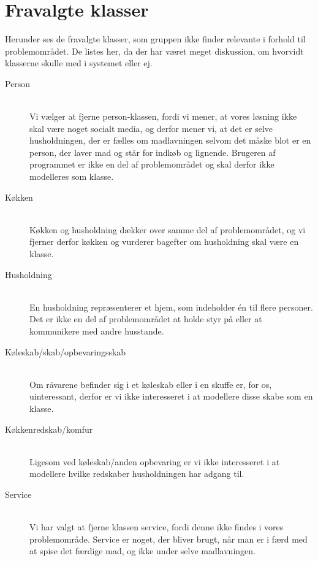 \chapter{Fravalgte klasser}
\label{ap:fravalgteklasser}

Herunder ses de fravalgte klasser, som gruppen ikke finder relevante i forhold til problemområdet. De listes her, da der har været meget diskussion, om hvorvidt klasserne skulle med i systemet eller ej. 

\begin{description}
\item[Person] \hfill \\
Vi vælger at fjerne person-klassen, fordi vi mener, at vores løsning ikke skal være noget socialt media, og derfor mener vi, at det er selve husholdningen, der er fælles om madlavningen selvom det måske blot er en person, der laver mad og står for indkøb og lignende. Brugeren af programmet er ikke en del af problemområdet og skal derfor ikke modelleres som klasse.

\item[Køkken] \hfill \\
Køkken og husholdning dækker over samme del af problemområdet, og vi fjerner derfor køkken og vurderer bagefter om husholdning skal være en klasse.

\item[Husholdning] \hfill \\
En husholdning repræsenterer et hjem, som indeholder én til flere personer. Det er ikke en del af problemområdet at holde styr på eller at kommunikere med andre husstande.

\item[Køleskab/skab/opbevaringsskab] \hfill \\
Om råvarene befinder sig i et køleskab eller i en skuffe er, for os, uinteressant, derfor er vi ikke interesseret i at modellere disse skabe som en klasse.

\item[Køkkenredskab/komfur] \hfill \\
Ligesom ved køleskab/anden opbevaring er vi ikke interesseret i at modellere hvilke redskaber husholdningen har adgang til.

\item[Service] \hfill \\ 
Vi har valgt at fjerne klassen service, fordi denne ikke findes i vores problemområde. Service er noget, der bliver brugt, når man er i færd med at spise det færdige mad, og ikke under selve madlavningen.


\end{description}
